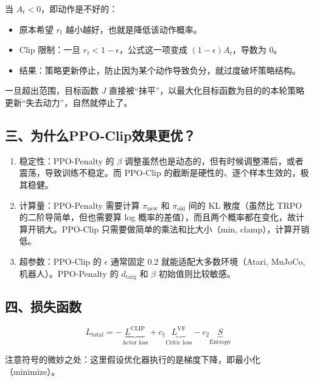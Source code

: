 当 \(A_t<0\)，即动作是不好的：

\begin{itemize}
\tightlist
\item
  原本希望 \(r_t\) 越小越好，也就是降低该动作概率。
\item
  Clip 限制：一旦 \(r_t<1-\epsilon\)，公式这一项变成 \((1-\epsilon)A_t\)，导数为 \(0\)。
\item
  结果：策略更新停止，防止因为某个动作导致负分，就过度破坏策略结构。
\end{itemize}

一旦超出范围，目标函数 \(J\) 直接被``抹平''，以最大化目标函数为目的的本轮策略更新``失去动力''，自然就停止了。

\hypertarget{ux4e09ux4e3aux4ec0ux4e48ppo-clipux6548ux679cux66f4ux4f18}{%
\subsection{三、为什么PPO-Clip效果更优？}\label{ux4e09ux4e3aux4ec0ux4e48ppo-clipux6548ux679cux66f4ux4f18}}

\begin{enumerate}
\def\labelenumi{\arabic{enumi}.}
\item
  稳定性：PPO-Penalty 的 \(\beta\) 调整虽然也是动态的，但有时候调整滞后，或者震荡，导致训练不稳定。而 PPO-Clip 的截断是硬性的、逐个样本生效的，极其稳健。
\item
  计算量：PPO-Penalty 需要计算 \(\pi_{\mathrm{new}}\) 和 \(\pi_{\mathrm{old}}\) 间的 KL 散度（虽然比 TRPO 的二阶导简单，但也需要算 log 概率的差值），而且两个概率都在变化，故计算开销大。PPO-Clip 只需要做简单的乘法和比大小（min, clamp），计算开销低。
\item
  超参数：PPO-Clip 的 \(\epsilon\) 通常固定 \(0.2\) 就能适配大多数环境（Atari, MuJoCo,机器人）。PPO-Penalty 的 \(d_{\mathrm{targ}}\) 和 \(\beta\) 初始值则比较敏感。
\end{enumerate}

\hypertarget{ux56dbux635fux5931ux51fdux6570-1}{%
\subsection{四、损失函数}\label{ux56dbux635fux5931ux51fdux6570-1}}

\[
L_{\mathrm{total}}=-\underbrace{L^{\mathrm{CLIP}}}_{\text{Actor loss}}+c_1\underbrace{L^{\mathrm{VF}}}_{\text{Critic loss}}-c_2\underbrace{S}_{\text{Entropy}}
\]

注意符号的微妙之处：这里假设优化器执行的是梯度下降，即最小化（minimize）。

